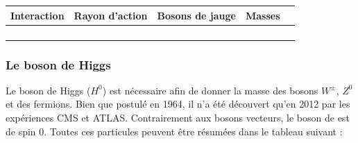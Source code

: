 \vspace{1cm}
\begin{table}[ht!]
	\centering
	\begin{tabular}{|O|O|O|O|N}
		\hline 
		Interaction&Rayon d'action&Bosons de jauge&Masses\\
		\hline 
		&
		& 
		&
		\\
		\hline 
		&
		\shortstack{ $\infty$}& 
		&
		\\
		\hline 
		&
		& 
		&
		\\
		\hline 
		&
		\shortstack{$\infty$}& 
		&
		\\
		\hline 
\end{tabular} 
\label{bosons}
\end{table}

\subsubsection{Le boson de Higgs}
Le boson de Higgs ($H^{0}$) est nécessaire afin de donner la masse des bosons $W^{\pm}$, $Z^{0}$ et des fermions. Bien que postulé en \num{1964}, il n'a été découvert qu'en \num{2012} par les expériences CMS et ATLAS. Contrairement aux bosons vecteurs, le boson de  est de spin \num{0}.
\newpage
Toutes ces particules peuvent être résumées dans le tableau suivant : 

